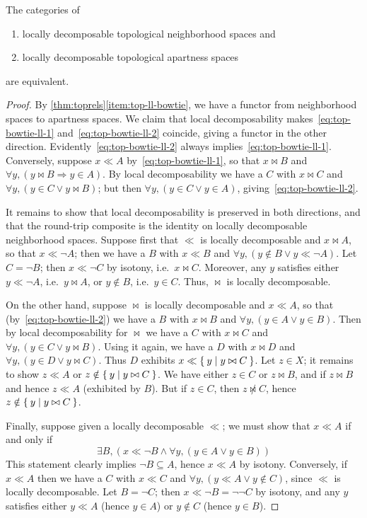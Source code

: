 \documentclass{article}
\def\cpl#1{\neg #1}
\let\implies\Rightarrow
\begin{document}
\begin{thm}\label{thm:top-locdec-equiv}
  The categories of
  \begin{enumerate}
  \item locally decomposable topological neighborhood spaces and
  \item locally decomposable topological apartness spaces
  \end{enumerate}
  are equivalent.
\end{thm}
\begin{proof}
  By \ref{thm:toprels}\ref{item:top-ll-bowtie}, we have a functor from neighborhood spaces to apartness spaces.
  We claim that local decomposability makes~\eqref{eq:top-bowtie-ll-1} and~\eqref{eq:top-bowtie-ll-2} coincide, giving a functor in the other direction.
  Evidently~\eqref{eq:top-bowtie-ll-2} always implies~\eqref{eq:top-bowtie-ll-1}.
  Conversely, suppose $x\ll A$ by~\eqref{eq:top-bowtie-ll-1}, so that $x\bowtie B$ and $\forall y, (y\bowtie B \implies y\in A)$.
  By local decomposability we have a $C$ with $x\bowtie C$ and $\forall y, (y\in C \lor y\bowtie B)$; but then $\forall y, (y\in C \lor y\in A)$, giving~\eqref{eq:top-bowtie-ll-2}.

  It remains to show that local decomposability is preserved in both directions, and that the round-trip composite is the identity on locally decomposable neighborhood spaces.
  Suppose first that $\ll$ is locally decomposable and $x \bowtie A$, so that $x\ll \cpl{A}$; then we have a $B$ with $x\ll B$ and $\forall y, (y\notin B \lor y\ll \cpl{A})$.
  Let $C = \cpl{B}$; then $x\ll \cpl{C}$ by isotony, i.e.\ $x\bowtie C$.
  Moreover, any $y$ satisfies either $y\ll\cpl{A}$, i.e.\ $y\bowtie A$, or $y\notin B$, i.e.\ $y\in C$.
  Thus, $\bowtie$ is locally decomposable.

  On the other hand, suppose $\bowtie$ is locally decomposable and $x\ll A$, so that (by~\eqref{eq:top-bowtie-ll-2}) we have a $B$ with $x\bowtie B$ and $\forall y, (y\in A \lor y\in B)$.
  Then by local decomposability for $\bowtie$ we have a $C$ with $x\bowtie C$ and $\forall y, (y\in C \lor y\bowtie B)$.
  Using it again, we have a $D$ with $x\bowtie D$ and $\forall y, (y\in D \lor y\bowtie C)$.
  Thus $D$ exhibits $x\ll \Set{y|y\bowtie C}$.
  Let $z\in X$; it remains to show $z\ll A$ or $z\notin \Set{y|y\bowtie C}$.
  We have either $z\in C$ or $z\bowtie B$, and if $z\bowtie B$ and hence $z\ll A$ (exhibited by $B$).
  But if $z\in C$, then $z\not\bowtie C$, hence $z\notin \Set{y|y\bowtie C}$.

  Finally, suppose given a locally decomposable $\ll$; we must show that $x\ll A$ if and only if
  \[ \exists B, (x\ll \cpl{B} \land \forall y, (y\in A \lor y\in B)) \]
  This statement clearly implies $\cpl{B}\subseteq A$, hence $x\ll A$ by isotony.
  Conversely, if $x\ll A$ then we have a $C$ with $x\ll C$ and $\forall y, (y\ll A \lor y\notin C)$, since $\ll$ is locally decomposable.
  Let $B = \cpl{C}$; then $x\ll \cpl{B} = \cpl{\cpl{C}}$ by isotony,
  and any $y$ satisfies either $y\ll A$ (hence $y\in A$) or $y\notin C$ (hence $y\in B$).
\end{proof}
\end{document}
